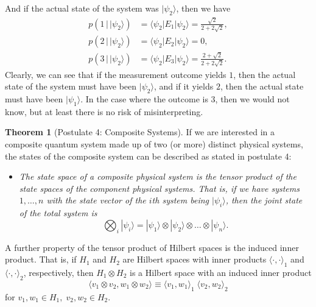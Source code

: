 \documentclass{article}
\theoremstyle{definition}
\newtheorem{theorem}{Theorem}[section]
\begin{document}
And if the actual state of the system was $|\psi_2 \rangle$, then we have
\begin{align*}
    p(1 \,|\, |\psi_2 \rangle) & = \langle \psi_2 | E_1 | \psi_2 \rangle = \frac{\sqrt{2}}{2 + 2\sqrt{2}}, \\
    p(2 \,|\, |\psi_2 \rangle) & = \langle \psi_2 | E_2 | \psi_2 \rangle = 0, \\
    p(3 \,|\, |\psi_2 \rangle) & = \langle \psi_2 | E_3 | \psi_2 \rangle =  \frac{2 + \sqrt{2}}{2 + 2\sqrt{2}}.
\end{align*}
Clearly, we can see that if the measurement outcome yields $1$, then the actual state of the system must have been $|\psi_2\rangle$, and if it yields $2$, then the actual state must have been $|\psi_1 \rangle$. In the case where the outcome is $3$, then we would not know, but at least there is no risk of misinterpreting.

\begin{theorem}[Postulate 4: Composite Systems]
If we are interested in a composite quantum system made up of two (or more) distinct physical systems, the states of the composite system can be described as stated in postulate 4:
\begin{itemize}
    \item \textit{The state space of a composite physical system is the tensor product of the state spaces of the component physical systems. That is, if we have systems $1, \ldots, n$ with the state vector of the $i$th system being $|\psi_i \rangle$, then the joint state of the total system is}
      \[\bigotimes_i |\psi_i \rangle = |\psi_1 \rangle \otimes |\psi_2 \rangle \otimes \ldots \otimes |\psi_n \rangle.\]
\end{itemize}
A further property of the tensor product of Hilbert spaces is the induced inner product. That is, if $H_1$ and $H_2$ are Hilbert spaces with inner products $\langle \cdot, \cdot \rangle_1$ and $\langle \cdot, \cdot \rangle_2$, respectively, then $H_1 \otimes H_2$ is a Hilbert space with an induced inner product
\[\langle v_1 \otimes v_2 , w_1 \otimes w_2 \rangle \equiv \langle v_1, w_1\rangle_1 \; \langle v_2, w_2 \rangle_2\]
for $v_1, w_1 \in H_1, \; v_2, w_2 \in H_2$. 
\end{theorem}
\end{document}
